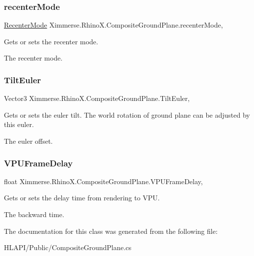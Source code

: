 \subsubsection{\texorpdfstring{recenter\+Mode}{recenterMode}}
{\footnotesize\ttfamily \mbox{\hyperlink{class_ximmerse_1_1_rhino_x_1_1_composite_ground_plane_a04f66929fadbcaaf0d0f9c53cd856dfd}{Recenter\+Mode}} Ximmerse.\+Rhino\+X.\+Composite\+Ground\+Plane.\+recenter\+Mode\hspace{0.3cm}{\ttfamily [get]}, {\ttfamily [set]}}



Gets or sets the recenter mode. 

The recenter mode.\mbox{\label{class_ximmerse_1_1_rhino_x_1_1_composite_ground_plane_a0c19ad531b87d3b3cd8f91f018339a41}} 
\subsubsection{\texorpdfstring{Tilt\+Euler}{TiltEuler}}
{\footnotesize\ttfamily Vector3 Ximmerse.\+Rhino\+X.\+Composite\+Ground\+Plane.\+Tilt\+Euler\hspace{0.3cm}{\ttfamily [get]}, {\ttfamily [set]}}



Gets or sets the euler tilt. The world rotation of ground plane can be adjusted by this euler. 

The euler offset.\mbox{\label{class_ximmerse_1_1_rhino_x_1_1_composite_ground_plane_a7246973f95874588d8e595abfb5dce6c}} 
\subsubsection{\texorpdfstring{V\+P\+U\+Frame\+Delay}{VPUFrameDelay}}
{\footnotesize\ttfamily float Ximmerse.\+Rhino\+X.\+Composite\+Ground\+Plane.\+V\+P\+U\+Frame\+Delay\hspace{0.3cm}{\ttfamily [get]}, {\ttfamily [set]}}



Gets or sets the delay time from rendering to V\+PU. 

The backward time.

The documentation for this class was generated from the following file\+:\begin{DoxyCompactItemize}
\item 
H\+L\+A\+P\+I/\+Public/Composite\+Ground\+Plane.\+cs\end{DoxyCompactItemize}
